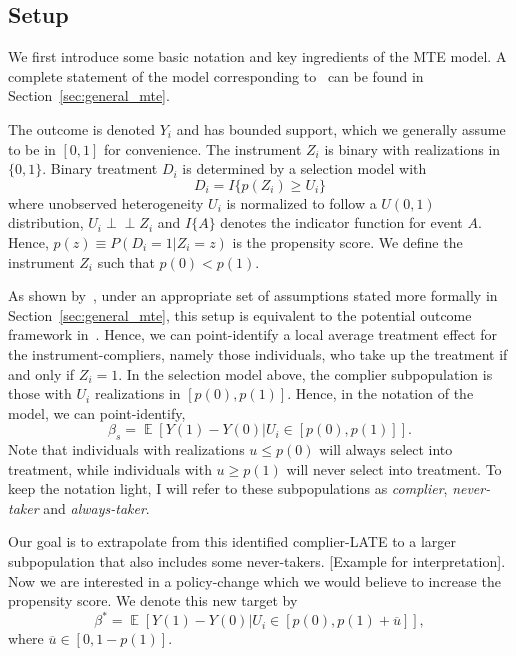 \documentclass[12pt,a4paper,english]{article} %
\DeclareMathOperator*{\E}{\mathbb{E}}
\newcommand{\indep}{\perp\!\!\!\!\perp}
\numberwithin{equation}{section}
\theoremstyle{definition}
\theoremstyle{remark}
\theoremstyle{plain}
\begin{document}
\subsection{Setup}
We first introduce some basic notation and key ingredients of the MTE model.
A complete statement of the model corresponding to~\cite{mogstad2018using} can be found in Section~\ref{sec:general_mte}.

The outcome is denoted $Y_i$ and has bounded support, which we generally assume to be in $[0,1]$ for convenience.
The instrument $Z_i$ is binary with realizations in $\{0,1\}$.
Binary treatment $D_i$ is determined by a selection model with
\begin{equation}\label{eq:treatment}
  D_i = I\{p(Z_i) \geq U_i\}
\end{equation}
where unobserved heterogeneity $U_i$ is normalized to follow a $U(0,1)$ distribution, $U_i \indep Z_i$ and $I\{A\}$ denotes the indicator function for event $A$.
Hence, $p(z) \equiv P(D_i=1|Z_i=z)$ is the propensity score. We define the instrument $Z_i$ such that $p(0)<p(1)$.

As shown by~\cite{vytlacil2002independence}, under an appropriate set of assumptions stated more formally in Section~\ref{sec:general_mte}, this setup is equivalent to the potential outcome framework in~\cite{imbens_angrist1994ecma}.
Hence, we can point-identify a local average treatment effect for the instrument-compliers, namely those individuals, who take up the treatment if and only if $Z_i=1$.
In the selection model above, the complier subpopulation is those with $U_i$ realizations in $[p(0), p(1)]$.
Hence, in the notation of the model, we can point-identify,
\begin{equation}
  \beta_s = \E[Y(1) - Y(0)|U_i\in[p(0), p(1)]].
\end{equation}
Note that individuals with realizations $u \leq p(0)$ will always select into treatment, while individuals with $u \geq p(1)$ will never select into treatment.
To keep the notation light, I will refer to these subpopulations as \textit{complier}, \textit{never-taker} and \textit{always-taker}.

Our goal is to extrapolate from this identified complier-LATE to a larger subpopulation that also includes some never-takers.
[Example for interpretation]. Now we are interested in a policy-change which we would believe to increase the propensity score.
We denote this new target by
\begin{equation}
  \beta^* = \E[Y(1) - Y(0)|U_i \in[p(0), p(1) + \overline{u}]],
\end{equation}
where $\overline{u}\in[0, 1-p(1)]$.
\end{document}
